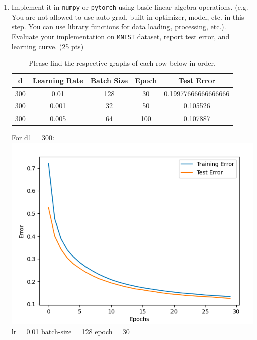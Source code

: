 \documentclass[a4paper]{article}
\theoremstyle{definition}
\newenvironment{soln}{
    \leavevmode\color{blue}\ignorespaces
}{}
\begin{document}
\begin{enumerate}
\begin{soln}
	
    \end{soln}
    \item Implement it in {\tt numpy} or {\tt pytorch} using basic linear algebra operations. (e.g. You are not allowed to use auto-grad, built-in optimizer, model, etc. in this step. You can use library functions for data loading, processing, etc.). Evaluate your implementation on {\tt MNIST} dataset, report test error, and learning curve. (25 pts) 
    \begin{soln}
    \begin{table}[h!]
\centering
\begin{tabular}{||c c c c c ||} 
 \hline
 d & Learning Rate & Batch Size & Epoch & Test Error \\ [0.5ex] 
 \hline\hline
 300 & 0.01 & 128 & 30 & 0.19977666666666666 \\ 
 300 & 0.001 & 32 & 50 & 0.105526 \\
 300 & 0.005 & 64 & 100 & 0.107887 \\[1ex] 
 \hline
\end{tabular}
\caption{Please find the respective graphs of each row below in order.}
\label{table:1}
\end{table}
\begin{center}
For d1 = 300: \\
 \includegraphics[scale=0.4]{d1=300e1=30}\\
  lr = 0.01 batch-size = 128 epoch = 30 \\

\end{center}
\end{soln}
\end{enumerate}
\end{document}
